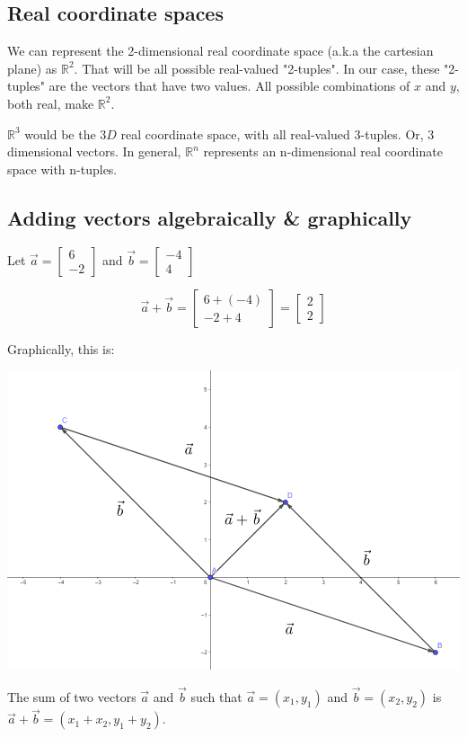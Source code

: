 \documentclass{article}
\begin{document}
\subsection{Real coordinate spaces}

We can represent the 2-dimensional real coordinate space (a.k.a the cartesian plane) as \(\mathbb{R}^2\).
That will be all possible real-valued "2-tuples". In our case, these "2-tuples" are the vectors that have two values.
All possible combinations of \(x\) and \(y\), both real, make \(\mathbb{R}^2\).\\
\par \(\mathbb{R}^3\) would be the $3D$ real coordinate space, with all real-valued 3-tuples. Or, 3 dimensional vectors.
In general, \(\mathbb{R}^n\) represents an n-dimensional real coordinate space with n-tuples.

\subsection{Adding vectors algebraically \& graphically}

Let \(\vec{a}=\begin{bmatrix}
    6\\
    -2
\end{bmatrix}\)
and \(\vec{b}=\begin{bmatrix}
    -4\\
    4
\end{bmatrix}\)

\[\vec{a}+\vec{b}=\begin{bmatrix}
    6 + (-4)\\
    -2 + 4
\end{bmatrix}= \begin{bmatrix}
    2\\
    2
\end{bmatrix}\]

Graphically, this is:
\begin{center}
    \includegraphics[scale=0.5]{image 2.png}
\end{center}

\begin{theorem}
    The sum of two vectors $\vec{a}$ and $\vec{b}$ such that $\vec{a}=(x_1,y_1)$ and $\vec{b}=(x_2,y_2)$ is $\vec{a}+\vec{b}=(x_1+x_2,y_1+y_2).$
\end{theorem}
\end{document}
